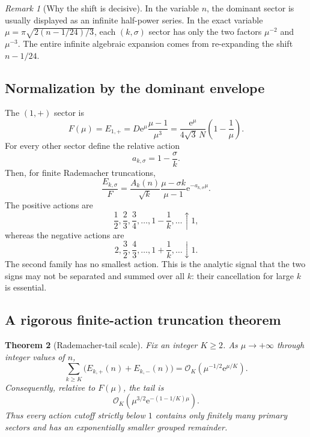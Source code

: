 \documentclass[11pt]{article}
\numberwithin{equation}{section}
\theoremstyle{mainthm}
\newtheorem{theorem}{Theorem}[section]
\theoremstyle{defstyle}
\theoremstyle{remark}
\newtheorem{remark}[theorem]{Remark}
\newcommand{\e}{\mathrm e}
\newcommand{\cO}{\mathcal O}
\begin{document}
\begin{remark}[Why the shift is decisive]
In the variable \(n\), the dominant sector is usually displayed as an infinite half-power series.  In the exact variable \(\mu=\pi\sqrt{2(n-1/24)/3}\), each \((k,\sigma)\) sector has only the two factors \(\mu^{-2}\) and \(\mu^{-3}\).  The entire infinite algebraic expansion comes from re-expanding the shift \(n-1/24\).
\end{remark}

\subsection{Normalization by the dominant envelope}

The \((1,+)\) sector is
\begin{equation}\label{eq:F-def}
 F(\mu)=E_{1,+}=D\e^\mu\frac{\mu-1}{\mu^3}
 =\frac{\e^\mu}{4\sqrt3\,N}\left(1-\frac1\mu\right).
\end{equation}
For every other sector define the relative action
\begin{equation}\label{eq:action-def}
 a_{k,\sigma}=1-\frac{\sigma}{k}.
\end{equation}
Then, for finite Rademacher truncations,
\begin{equation}\label{eq:normalized-tower}
 \frac{E_{k,\sigma}}{F}
 =\frac{A_k(n)}{\sqrt{k}}
  \frac{\mu-\sigma k}{\mu-1}\e^{-a_{k,\sigma}\mu}.
\end{equation}
The positive actions are
\[
 \frac12,\frac23,\frac34,\ldots,1-\frac1k,\ldots\uparrow1,
\]
whereas the negative actions are
\[
 2,\frac32,\frac43,\ldots,1+\frac1k,\ldots\downarrow1.
\]
The second family has no smallest action.  This is the analytic signal that the two signs may not be separated and summed over all \(k\): their cancellation for large \(k\) is essential.

\subsection{A rigorous finite-action truncation theorem}

\begin{theorem}[Rademacher-tail scale]\label{thm:rademacher-tail}
Fix an integer \(K\ge2\).  As \(\mu\to+\infty\) through integer values of \(n\),
\begin{equation}\label{eq:rademacher-tail-bound}
 \sum_{k\ge K}\bigl(E_{k,+}(n)+E_{k,-}(n)\bigr)
 =\cO_K\!\left(\mu^{-1/2}\e^{\mu/K}\right).
\end{equation}
Consequently, relative to \(F(\mu)\), the tail is
\begin{equation}\label{eq:rademacher-relative-tail}
 \cO_K\!\left(\mu^{3/2}\e^{-(1-1/K)\mu}\right).
\end{equation}
Thus every action cutoff strictly below \(1\) contains only finitely many primary sectors and has an exponentially smaller grouped remainder.
\end{theorem}
\end{document}
